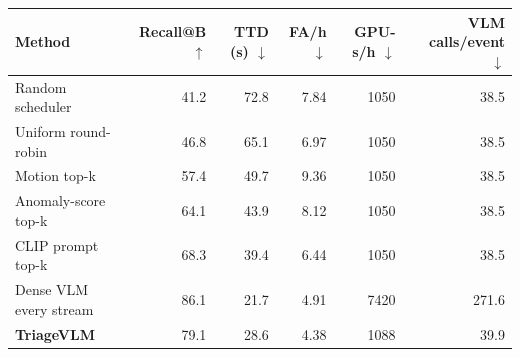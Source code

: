 \begin{tabular}{lrrrrr}
\toprule
Method & Recall@B $\uparrow$ & TTD (s) $\downarrow$ & FA/h $\downarrow$ & GPU-s/h $\downarrow$ & VLM calls/event $\downarrow$ \\
\midrule
Random scheduler & 41.2 & 72.8 & 7.84 & 1050 & 38.5 \\
Uniform round-robin & 46.8 & 65.1 & 6.97 & 1050 & 38.5 \\
Motion top-k & 57.4 & 49.7 & 9.36 & 1050 & 38.5 \\
Anomaly-score top-k & 64.1 & 43.9 & 8.12 & 1050 & 38.5 \\
CLIP prompt top-k & 68.3 & 39.4 & 6.44 & 1050 & 38.5 \\
Dense VLM every stream & 86.1 & 21.7 & 4.91 & 7420 & 271.6 \\
\textbf{TriageVLM} & 79.1 & 28.6 & 4.38 & 1088 & 39.9 \\
\bottomrule
\end{tabular}
